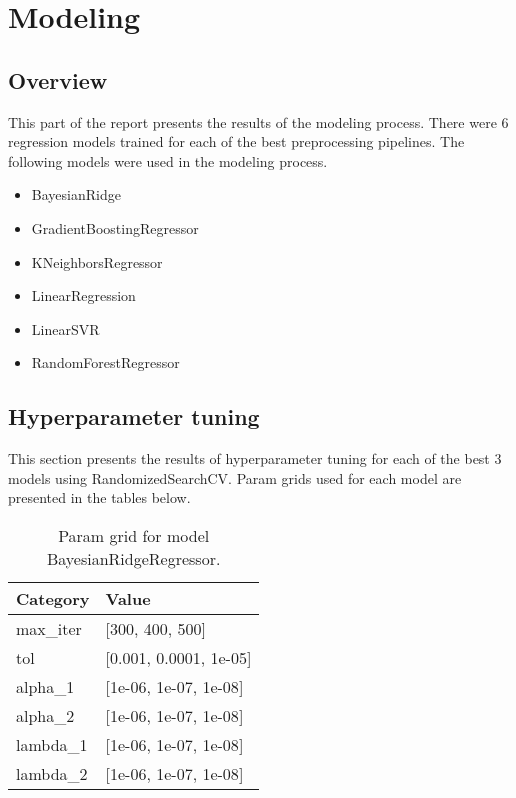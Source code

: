 \documentclass{article}%
\begin{document}
%
\section{Modeling}%
\label{sec:Modeling}%

%
\subsection{Overview}%
\label{subsec:Overview}%

%
This part of the report presents the results of the modeling process. There were 6 regression models trained for each of the best preprocessing pipelines. \newline%
The following models were used in the modeling process. \newline%
\begin{itemize}%
\item%
BayesianRidge%
\item%
GradientBoostingRegressor%
\item%
KNeighborsRegressor%
\item%
LinearRegression%
\item%
LinearSVR%
\item%
RandomForestRegressor%
\end{itemize}%
\subsection{Hyperparameter tuning}%
\label{subsec:Hyperparametertuning}%

%
This section presents the results of hyperparameter tuning for each of the best 3 models using RandomizedSearchCV. Param grids used for each model are presented in the tables below. %


\begin{table}[H]%
\begin{center}%
\renewcommand{\arraystretch}{1.5}%
\begin{tabular}{l l}%
\hline%
\textbf{Category}&\textbf{Value}\\%
\hline%
max\_iter&{[}300, 400, 500{]}\\%
tol&{[}0.001, 0.0001, 1e{-}05{]}\\%
alpha\_1&{[}1e{-}06, 1e{-}07, 1e{-}08{]}\\%
alpha\_2&{[}1e{-}06, 1e{-}07, 1e{-}08{]}\\%
lambda\_1&{[}1e{-}06, 1e{-}07, 1e{-}08{]}\\%
lambda\_2&{[}1e{-}06, 1e{-}07, 1e{-}08{]}\\%
\hline%
\end{tabular}%
\end{center}%
\caption{Param grid for model BayesianRidgeRegressor.}%
\end{table}
\end{document}
